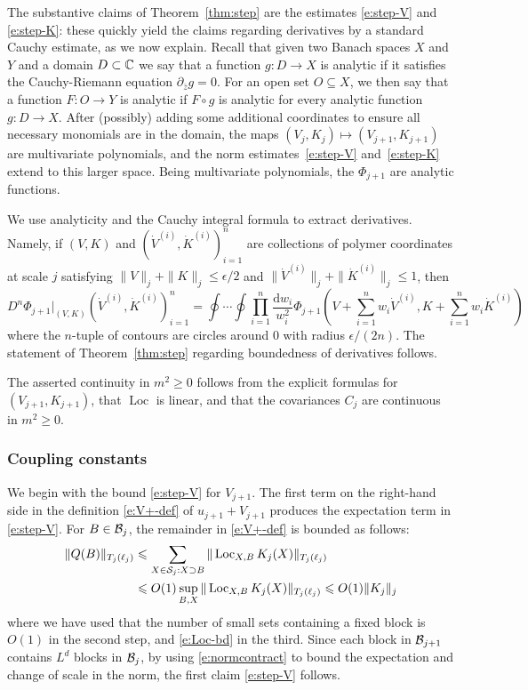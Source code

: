 \documentclass[11pt]{amsart}
\numberwithin{equation}{section}
\numberwithin{theorem}{section}
\newcommand{\1}{{\bf 1}}
\newcommand{\Loc}{\operatorname{Loc}}
\begin{document}
The substantive claims of Theorem~\ref{thm:step} are the estimates
\eqref{e:step-V} and \eqref{e:step-K}: these quickly yield the claims
regarding derivatives by a standard Cauchy estimate, as we now explain. 
Recall that given two Banach spaces $X$ and $Y$ and a domain
$D\subset \mathbb{C}$ we say that a function $g\colon D\rightarrow X$ is
analytic if it satisfies the Cauchy-Riemann equation
$\partial_{\bar{z}} g=0$.  For an open set $O\subseteq X$, we then say
that a function $F\colon O \rightarrow Y$ is analytic if $F\circ g$ is
analytic for every analytic function $g\colon D\rightarrow X$. After
(possibly) adding some additional coordinates to ensure all necessary
monomials are in the domain, the maps
$(V_j,K_j) \mapsto (V_{j+1},K_{j+1})$ are multivariate polynomials,
and the norm estimates~\eqref{e:step-V} and~\eqref{e:step-K} extend to
this larger space.  Being multivariate polynomials, the $\Phi_{j+1}$
are analytic functions.

We use analyticity and the Cauchy integral formula to extract
derivatives.
Namely, if $(V, K)$ and $(\dot{V}^{(i)}, \dot{K}^{(i)})_{i=1}^n$ are
collections of polymer coordinates at scale $j$ satisfying
$\|V\|_j+\|K\|_j\leq \epsilon/2$ and
$\|\dot V^{(i)}\|_j+\|\dot K^{(i)}\|_j \leq 1$, then
\begin{equation}
  D^{n} \Phi_{j+1}|_{(V, K)} (\dot{V}^{(i)}, \dot{K}^{(i)})_{i=1}^{n}
  =\oint \cdots \oint \prod_{i=1}^{n} \frac{ \textrm{d} w_i}{w_i^2} \Phi_{j+1}(V+ \sum_{i=1}^{n} w_i \dot{V}^{(i)}, K+\sum_{i=1}^{n} w_i \dot{K}^{(i)} )
\end{equation}
where the $n$-tuple of contours are circles around $0$ with radius $\epsilon/(2 n)$.
The statement of Theorem~\ref{thm:step} regarding boundedness of derivatives follows.

The asserted continuity in $m^{2} \geq 0$ follows from the explicit
formulas for $(V_{j+1},K_{j+1})$, that $\Loc$ is linear, and that the
covariances $C_{j}$ are continuous in $m^{2} \geq 0$.

\subsubsection{Coupling constants}
\label{sec:K-coupling}

We begin with the bound \eqref{e:step-V} for $V_{j+1}$.  The first
term on the right-hand side in the definition \eqref{e:V+-def} of
$u_{j+1}+V_{j+1}$ produces the expectation term in \eqref{e:step-V}.
For $B\in \mathcal B_j$, the remainder in \eqref{e:V+-def} is bounded as
follows:
\begin{align}
\label{E:Q}
  \|Q(B)\|_{T_{j}(\ell_{j})}
  &\leq
    \sum_{X\in \cS_j: X \supset B}  \|\Loc_{X,B} K_j(X)\|_{T_{j}(\ell_{j})}
    \nnb
    &\leq O(1)
      \sup_{B,X}\|\Loc_{X,B} K_j(X)\|_{T_{j}(\ell_{j})}
    \leq O(1)
    \|K_j\|_j
\end{align}
where we have used that the number of small sets containing a fixed
block is $O(1)$ in the second step, and \eqref{e:Loc-bd} in
the third.  Since each block in $\mathcal B_{j+1}$ contains $L^d$
blocks in $\mathcal B_j$, by using \eqref{e:normcontract} to bound
the expectation and change of scale in the norm, the first claim
\eqref{e:step-V} follows.
\end{document}
